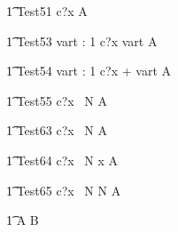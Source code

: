 
\begin{circusaction}
   \t1 Test51 \circdef c?x \then  {} \rcirctime A \\
\end{circusaction}

\begin{circusaction}
   \t1 Test53 \circdef \circvres vart : 1   \circspot c?x \then  \lcirctime vart \rcirctime A \\
\end{circusaction}

\begin{circusaction}
   \t1 Test54 \circdef \circvres vart : 1   \circspot c?x \then  {} + vart \rcirctime A \\
\end{circusaction}



\begin{circusaction}
   \t1 Test55 \circdef c?x \circat~N  \then A \\
\end{circusaction}


 
\begin{circusaction}
    \t1 Test63 \circdef c?x \circat~N  \then {} \rcirctime A \\
\end{circusaction}

\begin{circusaction}
    \t1 Test64 \circdef c?x \circat~N  \then \lcirctime x \rcirctime A \\
\end{circusaction} 

\begin{circusaction}
    \t1 Test65 \circdef c?x \circat~N  \then \lcirctime N \rcirctime A \\
\end{circusaction}


\begin{circusaction}        
        \t1 \circspot A \circseq B\\
\end{circusaction}

\begin{circus}    
\circend
\end{circus}
